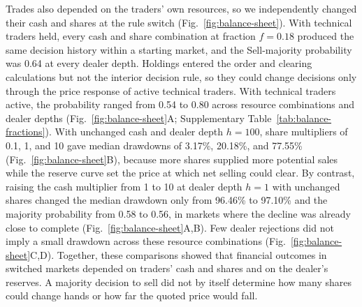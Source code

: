 Trades also depended on the traders' own resources, so we independently
changed their cash and shares at the rule switch (Fig.~\ref{fig:balance-sheet}). With technical traders held, every cash and
share combination at fraction $f=0.18$ produced the same decision
history within a starting market, and the Sell-majority probability was
0.64 at every dealer depth. Holdings entered the order and clearing
calculations but not the interior decision rule, so they could change
decisions only through the price response of active technical traders.
With technical traders active, the probability ranged from
0.54 to 0.80 across resource combinations and dealer depths
(Fig.~\ref{fig:balance-sheet}A; Supplementary Table~\ref{tab:balance-fractions}). With unchanged
cash and dealer depth $h=100$, share multipliers of 0.1, 1, and 10 gave
median drawdowns of 3.17\%, 20.18\%, and 77.55\%
(Fig.~\ref{fig:balance-sheet}B), because more shares supplied more potential sales
while the reserve curve set the price at which net selling could clear.
By contrast, raising the cash multiplier from 1 to 10 at dealer depth
$h=1$ with unchanged shares changed the median drawdown only from
96.46\% to 97.10\% and the majority probability from
0.58 to 0.56, in markets where the decline was already close to
complete (Fig.~\ref{fig:balance-sheet}A,B). Few dealer rejections did not imply a small drawdown
across these resource combinations (Fig.~\ref{fig:balance-sheet}C,D). Together,
these comparisons showed that financial outcomes in switched markets
depended on traders' cash and shares and on the dealer's reserves. A majority decision
to sell did not by itself determine how many shares could change hands
or how far the quoted price would fall.
